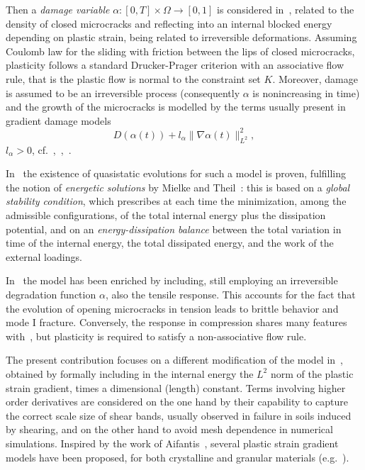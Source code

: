 \documentclass[reqno]{amsart}
\theoremstyle{definition}
\numberwithin{equation}{section}
\def\M {\mathbb M^{n\times n}_{\rm sym}}
\begin{document}
Then a \emph{damage variable} $\alpha\colon [0,T]\times\Omega\to [0,1]$ is considered in~\cite{KazMar18}, related to the density
of closed microcracks and reflecting into an internal blocked energy depending on plastic strain, 
being related
to irreversible deformations.  
Assuming Coulomb law for the sliding with friction between the lips of closed microcracks, plasticity follows a standard Drucker-Prager criterion with an associative flow rule, that is the plastic flow is normal to the constraint set $K$.
Moreover, damage is assumed to be an irreversible process (consequently $\alpha$ is nonincreasing in time) and the growth of the microcracks is modelled by the terms usually present in gradient damage models
$$D(\alpha(t))+ l_\alpha \|\nabla \alpha(t)\|_{L^2}^2,$$
$l_\alpha>0$, cf.~\cite{CRASII},~\cite[Section~4]{AMV},~\cite[Remark~3.1]{KazMar18}.

In~\cite{Cr3} the existence of quasistatic evolutions for such a model is proven, fulfilling the notion of \emph{energetic solutions} by Mielke and Theil~\cite{MieThe99MMRI}: this is based on a \emph{global stability condition}, which prescribes at each time the minimization, among the admissible configurations, of the total internal energy plus the dissipation potential, and on an \emph{energy-dissipation balance} between the total variation in time of the internal energy, the total dissipated energy, and the work of the external loadings. 

In~\cite{UllWamAleSamDegFra21} the model has been enriched by including, still employing an irreversible degradation function $\alpha$, also the tensile response. This accounts for the fact that the evolution of opening microcracks in tension leads to brittle behavior and mode I fracture. Conversely, the response in compression shares many features with~\cite{KazMar18}, but plasticity is required to satisfy a non-associative flow rule.

The present contribution focuses on a different modification of the model in~\cite{KazMar18}, obtained by formally including in the internal energy the $L^2$ norm of the plastic strain gradient, times a dimensional (length) constant. Terms involving higher order derivatives are considered on the one hand by their capability to capture the correct scale size of shear bands, usually observed in failure in soils induced by shearing, and on the other hand to avoid mesh dependence in numerical simulations.
Inspired by the work of Aifantis~\cite{Aif84}, several plastic strain gradient models have been proposed, for both crystalline and granular materials (e.g.~\cite{FleHut01, EGB03, Peerlings07, Forest09, PohPeeGeeSwa11, AnaAslChe12, MAM13, ZreKal16}).
\end{document}
